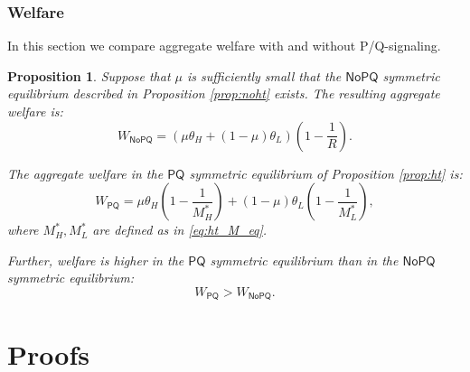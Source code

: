 \documentclass[11pt]{article}
\newcommand{\NoHT}{\ensuremath{\mathsf{NoPQ}}}
\newcommand{\HT}{\ensuremath{\mathsf{PQ}}}
\newtheorem{prop}{Proposition}
\newcommand{\hottowel}{P/Q-signaling}
\begin{document}
\subsubsection{Welfare}

In this section we compare aggregate welfare with and without \hottowel.  

\begin{prop}
\label{prop:compare_welfare}
Suppose that $\mu$ is sufficiently small that the $\NoHT$ symmetric equilibrium described in Proposition \ref{prop:noht} exists.
The resulting aggregate welfare is:
\begin{equation}
\label{eq:noht_aggw}
W_{\NoHT} = (\mu \theta_H + (1-\mu)\theta_L)\left( 1 - \frac{1}{R}\right).
\end{equation}

The aggregate welfare in the $\HT$ symmetric equilibrium of Proposition \ref{prop:ht} is:
\begin{equation}
\label{eq:ht_aggw}
W_{\HT} = \mu \theta_H\left( 1- \frac{1}{M_H^*}\right) + (1-\mu)\theta_L \left( 1 - \frac{1}{M_L^*}\right),
\end{equation}
where $M_H^*, M_L^*$ are defined as in \eqref{eq:ht_M_eq}.

Further, welfare is higher in the $\HT$ symmetric equilibrium than in the $\NoHT$ symmetric equilibrium:
\begin{equation}
\label{eq:welfare_ineq}
W_{\HT} > W_{\NoHT}.
\end{equation}
\end{prop}

\appendix
\section{Proofs}
\end{document}
